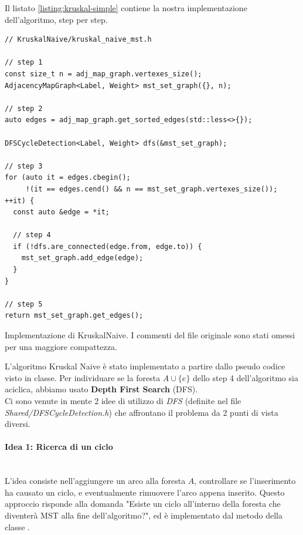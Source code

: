 \noindent Il listato \ref{listing:kruskal-simple} contiene la nostra implementazione dell'algoritmo, step per step.

\begin{listing}[!ht]
\begin{verbatim}
// KruskalNaive/kruskal_naive_mst.h

// step 1
const size_t n = adj_map_graph.vertexes_size();
AdjacencyMapGraph<Label, Weight> mst_set_graph({}, n);

// step 2
auto edges = adj_map_graph.get_sorted_edges(std::less<>{});

DFSCycleDetection<Label, Weight> dfs(&mst_set_graph);

// step 3
for (auto it = edges.cbegin();
     !(it == edges.cend() && n == mst_set_graph.vertexes_size()); ++it) {
  const auto &edge = *it;

  // step 4
  if (!dfs.are_connected(edge.from, edge.to)) {
    mst_set_graph.add_edge(edge);
  }
}

// step 5
return mst_set_graph.get_edges();
\end{verbatim}
\caption{Implementazione di KruskalNaive. I commenti del file originale sono stati omessi per una maggiore compattezza.}
\label{listing:kruskal-simple}
\end{listing}

\noindent L'algoritmo Kruskal Naive è stato implementato a partire dallo pseudo codice visto in classe. Per individuare se la foresta $A \cup \{ e \}$ dello step 4 dell'algoritmo sia aciclica, abbiamo usato \textbf{Depth First Search} (DFS). \\

\noindent Ci sono venute in mente 2 idee di utilizzo di \textit{DFS} (definite nel file \textit{Shared/DFSCycleDetection.h}) che affrontano il problema da 2 punti di vista diversi.

\paragraph{Idea 1: Ricerca di un ciclo}\mbox{} \\

\noindent L'idea consiste nell'aggiungere un arco alla foresta $A$, controllare se l'inserimento ha causato un ciclo, e eventualmente rimuovere l'arco appena inserito. Questo approccio risponde alla domanda "Esiste un ciclo all'interno della foresta che diventerà MST alla fine dell'algoritmo?", ed è implementato dal metodo  della classe .


